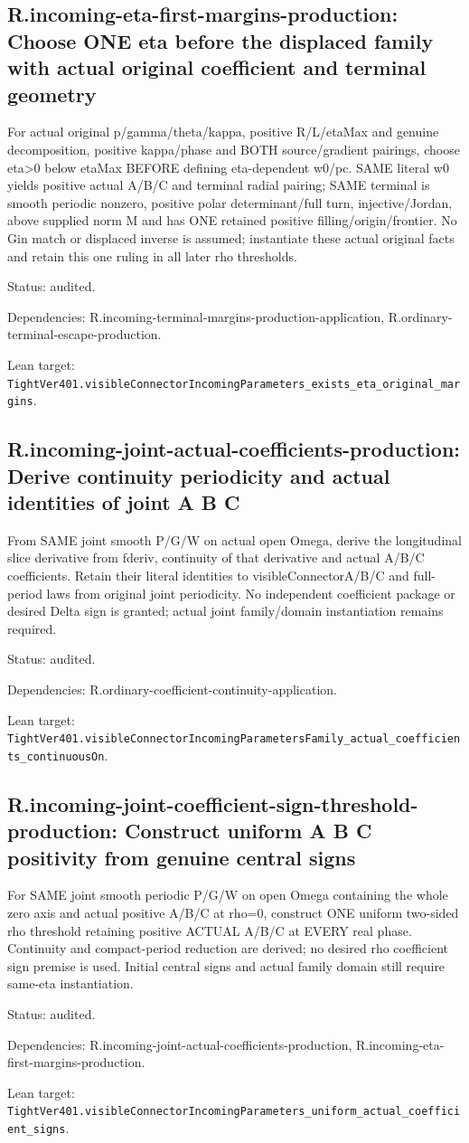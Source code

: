 \documentclass{article}
\begin{document}
\subsection*{R.incoming-eta-first-margins-production: Choose ONE eta before the displaced family with actual original coefficient and terminal geometry}
For actual original p/gamma/theta/kappa, positive R/L/etaMax and genuine decomposition, positive kappa/phase and BOTH source/gradient pairings, choose eta>0 below etaMax BEFORE defining eta-dependent w0/pc. SAME literal w0 yields positive actual A/B/C and terminal radial pairing; SAME terminal is smooth periodic nonzero, positive polar determinant/full turn, injective/Jordan, above supplied norm M and has ONE retained positive filling/origin/frontier. No Gin match or displaced inverse is assumed; instantiate these actual original facts and retain this one ruling in all later rho thresholds.
\par Status: audited.
\par Dependencies: R.incoming-terminal-margins-production-application, R.ordinary-terminal-escape-production.
\par Lean target: \texttt{TightVer401.visibleConnectorIncomingParameters\_exists\_eta\_original\_margins}.
\subsection*{R.incoming-joint-actual-coefficients-production: Derive continuity periodicity and actual identities of joint A B C}
From SAME joint smooth P/G/W on actual open Omega, derive the longitudinal slice derivative from fderiv, continuity of that derivative and actual A/B/C coefficients. Retain their literal identities to visibleConnectorA/B/C and full-period laws from original joint periodicity. No independent coefficient package or desired Delta sign is granted; actual joint family/domain instantiation remains required.
\par Status: audited.
\par Dependencies: R.ordinary-coefficient-continuity-application.
\par Lean target: \texttt{TightVer401.visibleConnectorIncomingParametersFamily\_actual\_coefficients\_continuousOn}.
\subsection*{R.incoming-joint-coefficient-sign-threshold-production: Construct uniform A B C positivity from genuine central signs}
For SAME joint smooth periodic P/G/W on open Omega containing the whole zero axis and actual positive A/B/C at rho=0, construct ONE uniform two-sided rho threshold retaining positive ACTUAL A/B/C at EVERY real phase. Continuity and compact-period reduction are derived; no desired rho coefficient sign premise is used. Initial central signs and actual family domain still require same-eta instantiation.
\par Status: audited.
\par Dependencies: R.incoming-joint-actual-coefficients-production, R.incoming-eta-first-margins-production.
\par Lean target: \texttt{TightVer401.visibleConnectorIncomingParameters\_uniform\_actual\_coefficient\_signs}.
\end{document}
